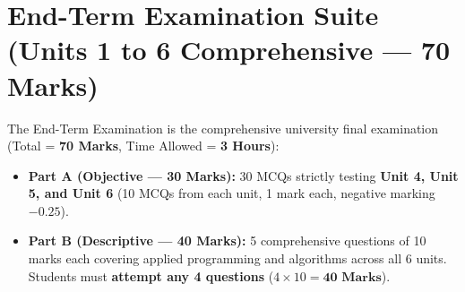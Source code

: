 \documentclass[a4paper,11pt,oneside,openany]{book}
\begin{document}
\newpage



\chapter{End-Term Examination Suite (Units 1 to 6 Comprehensive --- 70 Marks)}
\label{chap:endterm}
\noindent
The End-Term Examination is the comprehensive university final examination (Total = \textbf{70 Marks}, Time Allowed = \textbf{3 Hours}):
\begin{itemize}[leftmargin=8mm]
    \item \textbf{Part A (Objective --- 30 Marks):} 30 MCQs strictly testing \textbf{Unit 4, Unit 5, and Unit 6} (10 MCQs from each unit, 1 mark each, negative marking $-0.25$).
    \item \textbf{Part B (Descriptive --- 40 Marks):} 5 comprehensive questions of 10 marks each covering applied programming and algorithms across all 6 units. Students must \textbf{attempt any 4 questions} ($4 \times 10 = \mathbf{40\text{ Marks}}$).
\end{itemize}

\newpage


\end{document}
